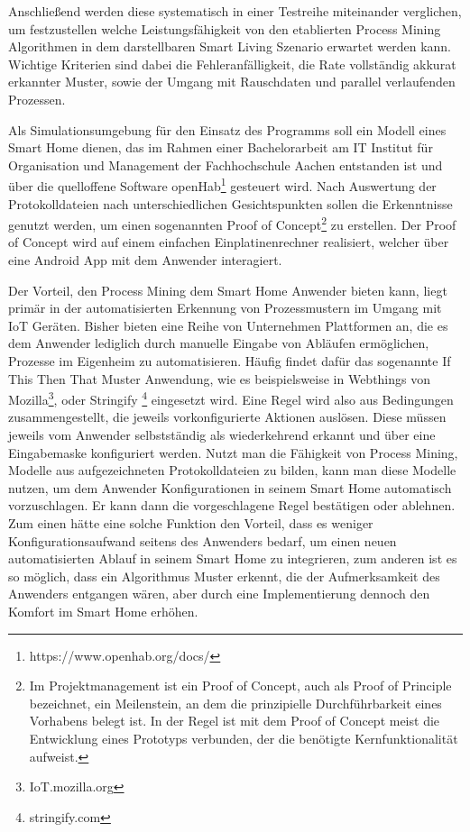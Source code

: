 Anschließend werden diese systematisch in einer Testreihe miteinander verglichen, um festzustellen welche Leistungsfähigkeit von den etablierten Process Mining Algorithmen in dem darstellbaren Smart Living Szenario erwartet werden kann. Wichtige Kriterien sind dabei die Fehleranfälligkeit, die Rate vollständig akkurat erkannter Muster, sowie der Umgang mit Rauschdaten und parallel verlaufenden Prozessen.

Als Simulationsumgebung für den Einsatz des Programms soll ein Modell eines Smart Home dienen, das im Rahmen einer Bachelorarbeit am IT Institut für Organisation und Management der Fachhochschule Aachen entstanden ist und über die quelloffene Software openHab\footnote{https://www.openhab.org/docs/} gesteuert wird. Nach Auswertung der Protokolldateien nach unterschiedlichen Gesichtspunkten sollen die Erkenntnisse genutzt werden, um einen sogenannten Proof of Concept\footnote{Im Projektmanagement ist ein Proof of Concept, auch als Proof of Principle bezeichnet, ein Meilenstein, an dem die prinzipielle Durchführbarkeit eines Vorhabens belegt ist. In der Regel ist mit dem Proof of Concept meist die Entwicklung eines Prototyps verbunden, der die benötigte Kernfunktionalität aufweist.\cite{poc}} zu erstellen. Der Proof of Concept wird auf einem einfachen Einplatinenrechner realisiert, welcher über eine Android App mit dem Anwender interagiert.

Der Vorteil, den Process Mining dem Smart Home Anwender bieten kann, liegt primär in der automatisierten Erkennung von Prozessmustern im Umgang mit IoT Geräten. Bisher bieten eine Reihe von Unternehmen Plattformen an, die es dem Anwender lediglich durch manuelle Eingabe von Abläufen ermöglichen, Prozesse im Eigenheim zu automatisieren. Häufig findet dafür das sogenannte If This Then That Muster Anwendung, wie es beispielsweise in Webthings von Mozilla\footnote{IoT.mozilla.org},  oder Stringify \footnote{stringify.com} eingesetzt wird. 
\newpage
Eine Regel wird also aus Bedingungen zusammengestellt, die jeweils vorkonfigurierte Aktionen auslösen. Diese müssen jeweils vom Anwender selbstständig als wiederkehrend erkannt und über eine Eingabemaske konfiguriert werden. Nutzt man die Fähigkeit von Process Mining, Modelle aus aufgezeichneten Protokolldateien zu bilden, kann man diese Modelle nutzen, um dem Anwender Konfigurationen in seinem Smart Home automatisch vorzuschlagen. Er kann dann die vorgeschlagene Regel bestätigen oder ablehnen. Zum einen hätte eine solche Funktion den Vorteil, dass es weniger Konfigurationsaufwand seitens des Anwenders bedarf, um einen neuen automatisierten Ablauf in seinem Smart Home zu integrieren, zum anderen ist es so möglich, dass ein Algorithmus Muster erkennt, die der Aufmerksamkeit des Anwenders entgangen wären, aber durch eine Implementierung dennoch den Komfort im Smart Home erhöhen.

